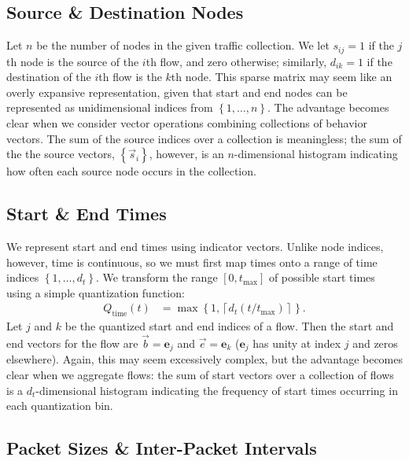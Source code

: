 \documentclass[conference]{IEEEtran}
\newcommand{\Qt}{Q_{\text{time}}}
\newcommand{\set}[1]{\left\{#1\right\}}
\newcommand{\ceil}[1]{\left\lceil#1\right\rceil}
\newcommand{\fracpx}[2]{(#1/#2)}
\begin{document}
\subsection{Source \& Destination Nodes}

Let $n$ be the number of nodes in the given traffic collection. We let $s_{ij}=1$ if the $j$th node is the source of the $i$th flow, and zero otherwise; similarly, $d_{ik}=1$ if the destination of the $i$th flow is the $k$th node. This sparse matrix may seem like an overly expansive representation, given that start and end nodes can be represented as unidimensional indices from $\set{1,\dots,n}$. The advantage becomes clear when we consider vector operations combining collections of behavior vectors. The sum of the source indices over a collection is meaningless; the sum of the the source vectors, $\set{\vec{s}_i}$, however, is an $n$-dimensional histogram indicating how often each source node occurs in the collection.

\subsection{Start \& End Times}

We represent start and end times using indicator vectors. Unlike node indices, however, time is continuous, so we must first map times onto a range of time indices $\set{1,\dots,d_t}$. We transform the range $[0,t_{\max}]$ of possible start times using a simple quantization function:
\begin{align}
\label{eqn:time-quantization}
\Qt(t) &= \max\set{1,\ceil{d_t\fracpx{t}{t_{\max}}}}.
\end{align}
Let $j$ and $k$ be the quantized start and end indices of a flow. Then the start and end vectors for the flow are $\vec{b}=\mathbf{e}_j$ and $\vec{e}=\mathbf{e}_k$ ($\mathbf{e}_j$ has unity at index $j$ and zeros elsewhere). Again, this may seem excessively complex, but the advantage becomes clear when we aggregate flows: the sum of start vectors over a collection of flows is a $d_t$-dimensional histogram indicating the frequency of start times occurring in each quantization bin.

\subsection{Packet Sizes \& Inter-Packet Intervals}
\end{document}
